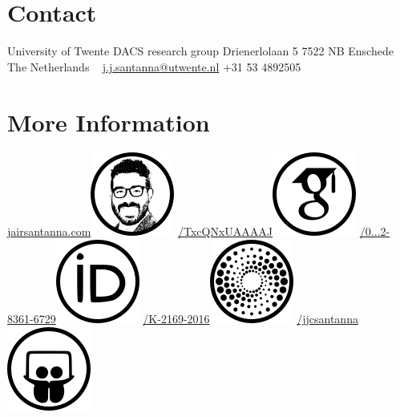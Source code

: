 \documentclass[print]{styles/friggeri-cv-mac} %
\begin{document}

\begin{aside} 
 \section{Contact}
University of Twente
DACS research group
Drienerlolaan 5 
7522 NB Enschede
The Netherlands
~
\href{mailto:j.j.santanna@utwente.nl}{j.j.santanna@utwente.nl}
+31 53 4892505
~
\section{More Information}\hspace{-1cm}
\href{http://www.jairsantanna.com}{jairsantanna.com}\includegraphics[scale=0.5]{img/jairsantanna.png}
\href{https://scholar.google.com/citations?user=TxcQNxUAAAAJ}{/TxcQNxUAAAAJ}\includegraphics[scale=0.3]{img/googlescholar.png}
\href{http://orcid.org/0000-0002-8361-6729}{/0...2-8361-6729}\includegraphics[scale=0.3]{img/orcid.png}
\href{http://www.researcherid.com/rid/K-2169-2016}{/K-2169-2016}\includegraphics[scale=0.3]{img/researchid.png}
\href{http://www.slideshare.net/jjcsantanna}{/jjcsantanna}\includegraphics[scale=0.3]{img/slideshare.png}

\end{aside}
\end{document}
